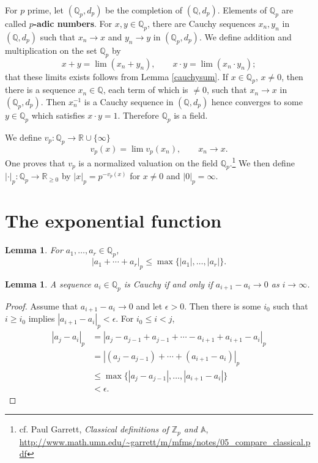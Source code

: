 \documentclass{article}
\theoremstyle{plain}
\newtheorem{lemma}[theorem]{Lemma}
\theoremstyle{definition}
\begin{document}
For $p$ prime, let $(\mathbb{Q}_p,d_p)$ be the completion of $(\mathbb{Q},d_p)$. Elements
of $\mathbb{Q}_p$ are called \textbf{$p$-adic numbers}.
For $x,y \in \mathbb{Q}_p$, there are Cauchy sequences $x_n,y_n$ in $(\mathbb{Q},d_p)$ such that
$x_n \to x$ and $y_n \to y$ in $(\mathbb{Q}_p,d_p)$. 
We define addition and multiplication on the set $\mathbb{Q}_p$ by
\[
x+y = \lim (x_n+y_n), \qquad x\cdot y= \lim (x_n\cdot y_n);
\]
that these limits exists follows from Lemma \ref{cauchysum}. 
If $x \in \mathbb{Q}_p$, $x \neq 0$, then there is a sequence $x_n \in \mathbb{Q}$, each term of which is $\neq 0$, 
such that $x_n \to x$ in $(\mathbb{Q}_p,d_p)$. 
Then $x_n^{-1}$ is a Cauchy sequence in $(\mathbb{Q},d_p)$ hence converges to some $y \in \mathbb{Q}_p$ which
satisfies $x\cdot y =1$. Therefore $\mathbb{Q}_p$ is a field. 

We define $v_p:\mathbb{Q}_p \to \mathbb{R} \cup \{\infty\}$ 
\[
v_p(x) = \lim v_p(x_n), \qquad x_n \to x.
\]
One proves that $v_p$ is a normalized valuation on the field $\mathbb{Q}_p$.\footnote{cf. Paul Garrett, {\em Classical definitions of $\mathbb{Z}_p$ and $\mathbb{A}$},
\url{http://www.math.umn.edu/~garrett/m/mfms/notes/05_compare_classical.pdf}}
We then 
define $|\cdot|_p:\mathbb{Q}_p \to \mathbb{R}_{\geq 0}$ by
$|x|_p=p^{-v_p(x)}$ for $x \neq 0$ and $|0|_p=\infty$. 



\section{The exponential function}
\begin{lemma}
For $a_1,\ldots,a_r \in \mathbb{Q}_p$,
\[
|a_1+\cdots+a_r|_p \leq \max\{|a_1|,\ldots,|a_r|\}.
\]
\end{lemma}

\begin{lemma}
A sequence $a_i \in \mathbb{Q}_p$ is Cauchy if and only if $a_{i+1}-a_i \to 0$ as $i \to \infty$.
\end{lemma}
\begin{proof}
Assume that $a_{i+1}-a_i \to 0$ and let $\epsilon>0$. Then there is some $i_0$ such that $i \geq i_0$ implies
$|a_{i+1}-a_i|_p < \epsilon$. For $i_0 \leq i < j$,
\begin{align*}
|a_j-a_i|_p&=|a_j-a_{j-1}+a_{j-1}+\cdots-a_{i+1}+a_{i+1}-a_i|_p\\
&=|(a_j-a_{j-1})+\cdots+(a_{i+1}-a_i)|_p\\
&\leq \max\{|a_j-a_{j-1}|,\ldots,|a_{i+1}-a_i|\}\\
&<\epsilon.
\end{align*}
\end{proof}
\end{document}
